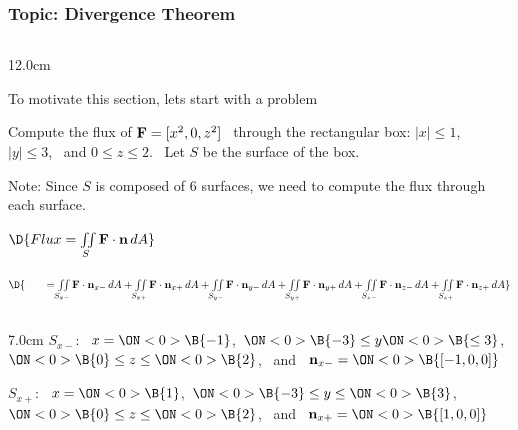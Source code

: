 \begin{frame}
\frametitle{Topic: Divergence Theorem}
\begin{columns}\begin{column}{12.0cm}

\scriptsize

\vspace{0.2cm}

To motivate this section, lets start with a problem

\vspace{0.2cm}

Compute the flux of ${\bf F} = [x^2,0,z^2]$ \, through the rectangular box: $|x| \le 1$, \, $|y| \le 3$, \, and $0 \le z \le 2$. \, Let $S$ be the surface of the box.

\vspace{0.2cm}

Note: Since $S$ is composed of 6 surfaces, we need to compute the flux through each surface.


\vspace{0.2cm}
 
$\D{Flux = \iint \limits_{S} {\bf F} \cdot {\bf n}\, dA}$

$\D{ \qquad = \iint \limits_{S_{x-}} {\bf F} \cdot {\bf n}_{x-}\, dA + \iint \limits_{S_{x+}} {\bf F} \cdot {\bf n}_{x+}\, dA + \iint \limits_{S_{y-}} {\bf F} \cdot {\bf n}_{y-}\, dA + \iint \limits_{S_{y+}} {\bf F} \cdot {\bf n}_{y+}\, dA + \iint \limits_{S_{z-}} {\bf F} \cdot {\bf n}_{z-}\, dA + \iint \limits_{S_{z+}} {\bf F} \cdot {\bf n}_{z+}\, dA}$

\vspace{0.2cm}

\begin{columns}
\begin{column}{7.0cm}
	$S_{x-}$: \, 
	$x=\ON<0>{\B{-1}}$,\, 
	$\ON<0>{\B{-3}} \le y 
	\ON<0>{\B{\le 3}}$,\, 
	$\ON<0>{\B{0}} \le z \le 
	\ON<0>{\B{2}}$, \, and \, ${\bf n}_{x-} = 
	\ON<0>{\B{[-1,0,0]}}$
	
	\vspace{0.4cm}
	
	$S_{x+}$: \, 
	$x=\ON<0>{\B{1}}$,\, 
	$\ON<0>{\B{-3}} \le y \le 
	\ON<0>{\B{3}}$,\, 
	$\ON<0>{\B{0}} \le z \le 
	\ON<0>{\B{2}}$, \, and \, ${\bf n}_{x+} = 
	\ON<0>{\B{[1,0,0]}}$
	

\end{column}
\end{columns}
\end{column}
\end{columns}
\end{frame}
